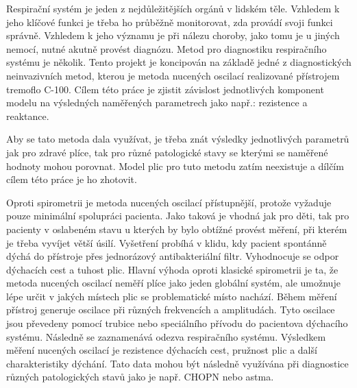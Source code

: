 Respirační systém je jeden z nejdůležitějších orgánů v lidském těle. Vzhledem k jeho klíčové funkci je třeba ho průběžně monitorovat, zda provádí svoji funkci správně. Vzhledem k jeho významu je při nálezu choroby, jako tomu je u jiných nemocí, nutné akutně provést diagnózu. 
Metod pro diagnostiku respiračního systému je několik. Tento projekt je koncipován na základě jedné z diagnostických neinvazivních metod, kterou je metoda nucených oscilací realizované přístrojem tremoflo C-100. Cílem této práce je zjistit závislost jednotlivých komponent modelu na výsledných naměřených parametrech jako např.: rezistence a reaktance. \cite{Vlcek2018}


Aby se tato metoda dala využívat, je třeba znát výsledky jednotlivých parametrů jak pro zdravé plíce, tak pro různé patologické stavy se kterými se naměřené hodnoty mohou porovnat. Model plic pro tuto metodu zatím neexistuje a dílčím cílem této práce je ho zhotovit. 


Oproti spirometrii je metoda nucených oscilací přístupnější, protože vyžaduje pouze minimální spolupráci pacienta. Jako taková je vhodná jak pro děti, tak pro pacienty v oslabeném stavu u kterých by bylo obtížné provést měření, při kterém je třeba vyvíjet větší úsilí. \cite{Vlcek2018} Vyšetření probíhá v klidu, kdy pacient spontánně dýchá do přístroje přes jednorázový antibakteriální filtr. Vyhodnocuje se odpor dýchacích cest a tuhost plic. \cite{Vlcek2018}
Hlavní výhoda oproti klasické spirometrii je ta, že metoda nucených oscilací neměří plíce jako jeden globální systém, ale umožnuje lépe určit v jakých místech plic se problematické místo nachází. \cite{Vlcek2018}
Během měření přístroj generuje oscilace při různých frekvencích a amplitudách. Tyto oscilace jsou převedeny pomocí trubice nebo speciálního přívodu do pacientova dýchacího systému. Následně se zaznamenává odezva respiračního systému. Výsledkem měření nucených oscilací je rezistence dýchacích cest, pružnost plic a další charakteristiky dýchání. Tato data mohou být následně využívána při diagnostice různých patologických stavů jako je např. CHOPN nebo astma. \cite{Vlcek2018}

